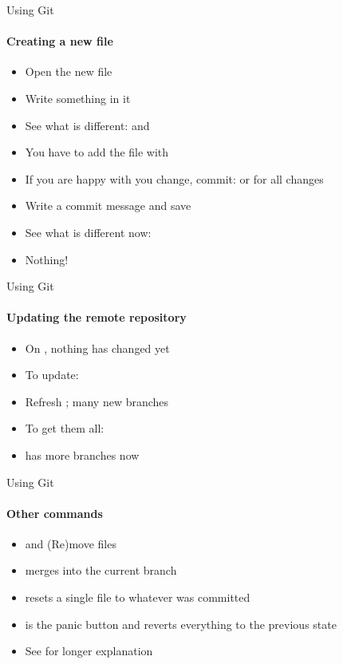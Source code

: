 \begin{frame}[<+->]{Using Git}
\framesubtitle{Creating a new file}
\begin{itemize}
\item Open the new file 
\item Write something in it
\item See what is different:  and 
\item You have to add the file with 
\item If you are happy with you change, commit:  or  for all changes
\item Write a commit message and save
\item See what is different now: 
\item Nothing!
\end{itemize}
\end{frame}
\begin{frame}[<+->]{Using Git}
\framesubtitle{Updating the remote repository}
\begin{itemize}
\item On , nothing has changed yet
\item To update: 
\item Refresh ; many new branches
\item To get them all: 
\item {} has more branches now
\end{itemize}
\end{frame}
\begin{frame}[<+->]{Using Git}
\framesubtitle{Other commands}
\begin{itemize}
\item {} and  (Re)move files
\item {} merges  into the current branch
\item  {} resets a single file to whatever was committed
\item {} is the panic button and reverts everything to the previous state
\item See  for longer explanation
\end{itemize}

\end{frame}

